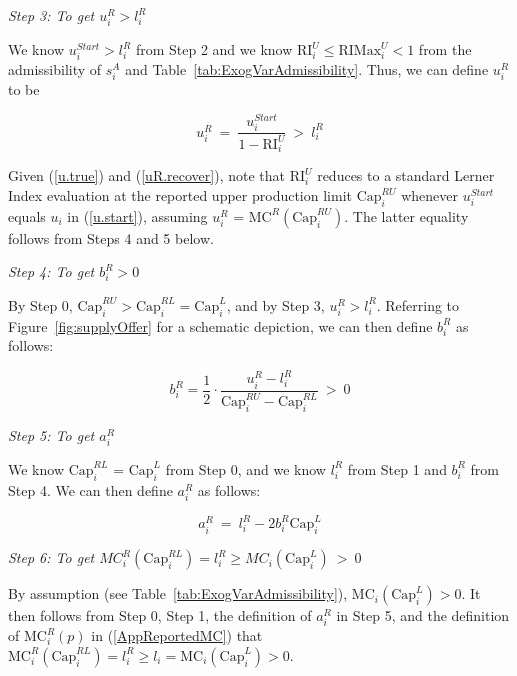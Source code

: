\documentclass[12pt]{article}
\begin{document}
\bigskip
\noindent\textit{Step 3: To get $u_i^R > l_i^R$}
\bigskip

We know $u_i^{Start} > l_i^R$ from Step 2 and we know $\mbox{RI}_i^U \le \mbox{RIMax}^U_i < 1$ from the admissibility of  $s^A_i$ and Table~\ref{tab:ExogVarAdmissibility}.  Thus, we can define $u_i^R$ to be

\begin{equation} \label{uR.recover}
	u_i^R ~= ~\frac{u_i^{Start}}{1 - \mbox{RI}_i^U} ~>~ l_i^R
\end{equation}

\medskip
\noindent
Given (\ref{u.true}) and (\ref{uR.recover}), note that $\mbox{RI}_i^U$ reduces to a standard Lerner Index evaluation at the reported upper production limit $\mbox{Cap}^{RU}_i$ whenever $u_i^{Start}$ equals $u_i$ in (\ref{u.start}), assuming $u_i^R$ = $\mbox{MC}^R(\mbox{Cap}^{RU}_i)$.  The latter equality follows from Steps 4 and 5 below.


\bigskip
\noindent\textit{Step 4: To get $b_i^R > 0$}
\bigskip

By Step 0, $\mbox{Cap}^{RU}_i > \mbox{Cap}^{RL}_i = \mbox{Cap}^L_i$, and by Step 3, $u_i^R > l_i^R$.  Referring to Figure~\ref{fig:supplyOffer} for a schematic depiction, we can then define $b^R_i$ as follows: 

\begin{equation} \label{bR.recover}
	b_i^R = \frac{1}{2}\cdot \frac{u_i^R - l_i^R}{\mbox{Cap}_i^{RU} - \mbox{Cap}_i^{RL}} ~ > ~ 0
\end{equation}


\bigskip
\noindent\textit{Step 5: To get $a_i^R$}
\bigskip

We know $\mbox{Cap}_i^{RL}$ = $\mbox{Cap}^L_i$  from Step 0, and we know $l_i^R$ from Step 1 and $b_i^R$ from Step 4.  We can then define $a_i^R$ as follows:

                \begin{equation} \label{aR.recover}
	a_i^R ~ = ~ l_i^R - 2 b_i^R \mbox{Cap}_i^{L}
                 \end{equation}

\bigskip
\noindent
\textit{Step 6: To get $MC^R_i(\mbox{Cap}^{RL}_i) = l^R_i \ge MC_i(\mbox{Cap}^L_i)~ > ~0 $ }

\bigskip
By assumption (see Table~\ref{tab:ExogVarAdmissibility}), $\mbox{MC}_i(\mbox{Cap}^{L}_i) > 0$.  It then follows from Step 0, Step 1, the definition of $a^R_i$ in Step 5, and the definition of $\mbox{MC}^R_i(p)$ in (\ref{AppReportedMC}) that $\mbox{MC}^R_i(\mbox{Cap}^{RL}_i) = l^R_i \ge l_i = \mbox{MC}_i(\mbox{Cap}^{L}_i) > 0.$
\end{document}
